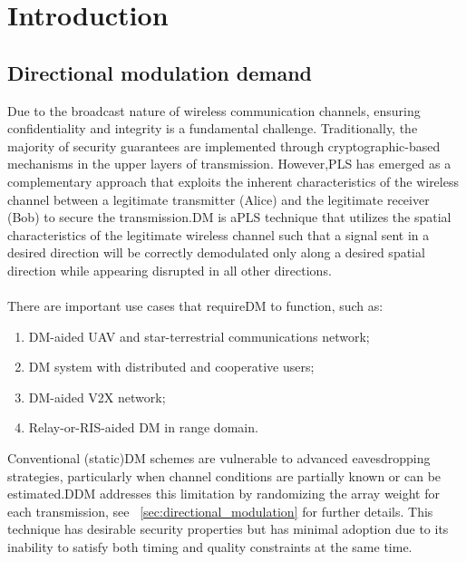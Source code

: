 
\chapter{Introduction}
\label{cap:introduction}

\section{Directional modulation demand}

Due to the broadcast nature of wireless communication channels, ensuring confidentiality and integrity is a fundamental challenge. Traditionally, the majority of security guarantees are implemented through cryptographic-based mechanisms in the upper layers of transmission. However,\gls{PLS}\cite{physec} has emerged as a complementary approach that exploits the inherent characteristics of the wireless channel between a legitimate transmitter (Alice) and the legitimate receiver (Bob) to secure the transmission.\gls{DM} is a\gls{PLS} technique that utilizes the spatial characteristics of the legitimate wireless channel such that a signal sent in a desired direction will be correctly demodulated only along a desired spatial direction while appearing disrupted in all other directions.\\
\\
There are important use cases that require\gls{DM} to function, such as:
\begin{enumerate}
	\item DM-aided UAV and star-terrestrial communications network;
	\item DM system with distributed and cooperative users;
	\item DM-aided V2X network;
	\item Relay-or-RIS-aided DM in range domain.
\end{enumerate}
Conventional (static)\gls{DM} schemes are vulnerable to advanced eavesdropping strategies, particularly when channel conditions are partially known or can be estimated.\gls{DDM} addresses this limitation by randomizing the array weight for each transmission, see \sectionname~\ref{sec:directional_modulation} for further details. This technique has desirable security properties but has minimal adoption due to its inability to satisfy both timing and quality constraints at the same time.

